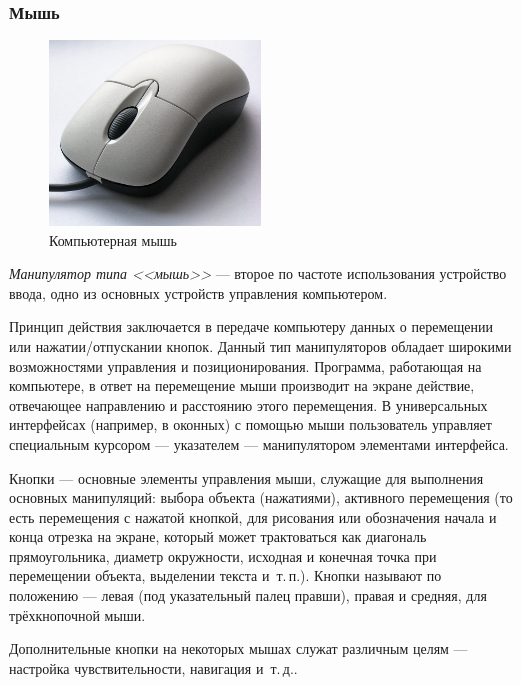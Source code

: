 \subsubsection{Мышь}\label{base:introduction:components:peripheral:mouse}
\begin{figure}
 \centering
 \includegraphics[width=0.5\textwidth]{base/Introduction/Mouse.jpg} 
 \caption{Компьютерная мышь}\label{base:introduction:components:peripheral:mousepic}
\end{figure}
\emph{Манипулятор типа <<мышь>>} --- второе по частоте использования устройство ввода, одно из основных устройств управления компьютером.

Принцип действия заключается в передаче компьютеру данных о перемещении или нажатии/отпускании кнопок.
Данный тип манипуляторов обладает широкими возможностями управления и позиционирования.
Программа, работающая на компьютере, в ответ на перемещение мыши производит на экране действие, отвечающее направлению и расстоянию этого перемещения.
В универсальных интерфейсах (например, в оконных) с помощью мыши пользователь управляет специальным курсором --- указателем --- манипулятором элементами интерфейса.

Кнопки --- основные элементы управления мыши, служащие для выполнения основных манипуляций: выбора объекта (нажатиями), активного перемещения (то есть перемещения с нажатой кнопкой, для рисования или обозначения начала и конца отрезка на экране, который может трактоваться как диагональ прямоугольника, диаметр окружности, исходная и конечная точка при перемещении объекта, выделении текста и~т.\,п.).
Кнопки называют по положению --- левая (под указательный палец правши), правая и средняя, для трёхкнопочной мыши.

Дополнительные кнопки на некоторых мышах служат различным целям --- настройка чувствительности, навигация и~т.\,д..


